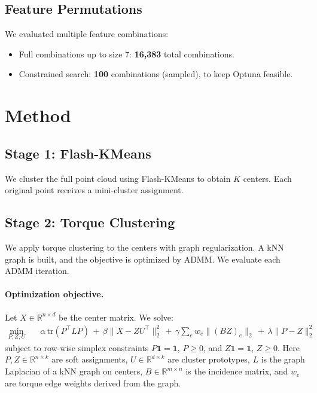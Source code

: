 \documentclass{article}
\begin{document}
\subsection{Feature Permutations}
We evaluated multiple feature combinations:
\begin{itemize}
\item Full combinations up to size 7: \textbf{16,383} total combinations.
\item Constrained search: \textbf{100} combinations (sampled), to keep Optuna feasible.
\end{itemize}

\section{Method}
\subsection{Stage 1: Flash-KMeans}
We cluster the full point cloud using Flash-KMeans to obtain $K$ centers. Each original point receives a mini-cluster assignment.

\subsection{Stage 2: Torque Clustering}
We apply torque clustering to the centers with graph regularization. A kNN graph is built, and the objective is optimized by ADMM. We evaluate each ADMM iteration.

\paragraph{Optimization objective.}
Let $X \in \mathbb{R}^{n \times d}$ be the center matrix. We solve:
\begin{align}
\min_{P,Z,U} \quad &
\alpha\, \mathrm{tr}(P^\top L P)
\, + \, \beta \lVert X - ZU^\top \rVert_2^2
\, + \, \gamma \sum_{e} w_e \lVert (BZ)_e \rVert_2
\, + \, \lambda \lVert P - Z \rVert_2^2
\end{align}
subject to row-wise simplex constraints $P \mathbf{1} = \mathbf{1}$, $P \ge 0$, and $Z \mathbf{1} = \mathbf{1}$, $Z \ge 0$. Here $P,Z \in \mathbb{R}^{n \times k}$ are soft assignments, $U \in \mathbb{R}^{d \times k}$ are cluster prototypes, $L$ is the graph Laplacian of a kNN graph on centers, $B \in \mathbb{R}^{m \times n}$ is the incidence matrix, and $w_e$ are torque edge weights derived from the graph.
\end{document}
